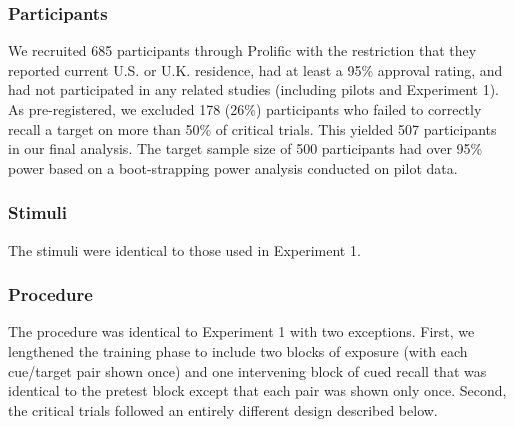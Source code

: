 \subsubsection{Participants}

We recruited 685 participants through Prolific with the restriction that they reported current U.S. or U.K. residence, had at least a 95\% approval rating, and had not participated in any related studies (including pilots and Experiment 1). As pre-registered, we excluded 178 (26\%) participants who failed to correctly recall a target on more than 50\% of critical trials. This yielded 507 participants in our final analysis. The target sample size of 500 participants had over 95\% power based on a boot-strapping power analysis conducted on pilot data.

\subsubsection{Stimuli}

The stimuli were identical to those used in Experiment 1.

\subsubsection{Procedure}

The procedure was identical to Experiment 1 with two exceptions. First, we lengthened the training phase to include two blocks of exposure (with each cue/target pair shown once) and one intervening block of cued recall that was identical to the pretest block except that each pair was shown only once. Second, the critical trials followed an entirely different design described below.

